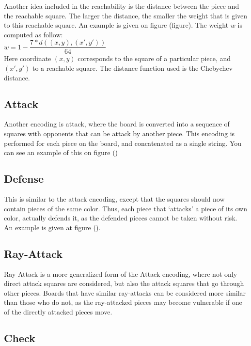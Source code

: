 \documentclass[11pt]{article}
\begin{document}
    Another idea included in the reachability is the distance between the piece and the reachable square. The larger the distance, the smaller the weight that is given to this reachable square. An example is given on figure (figure).
    The weight $w$ is computed as follow:\\

    $w = 1 - \dfrac{7 * d((x,y),(x',y'))}{64}$ \\

    Here coordinate $(x,y)$ corresponds to the square of a particular piece, and $(x',y')$ to a reachable square. The distance function used is the Chebychev distance.\\


    \subsection{Attack}

    Another encoding is attack, where the board is converted into a sequence of squares with opponents that can be attack by another piece. This encoding is performed for each piece on the board, and concatenated as a single string. You can see an example of this on figure ()

    \subsection{Defense}

    This is similar to the attack encoding, except that the squares should now contain pieces of the same color. Thus, each piece that `attacks' a piece of its own color, actually defends it, as the defended pieces cannot be taken without risk. An example is given at figure ().

    \subsection{Ray-Attack}

    Ray-Attack is a more generalized form of the Attack encoding, where not only direct attack squares are considered, but also the attack squares that go through other pieces. Boards that have similar ray-attacks can be considered more similar than those who do not, as the ray-attacked pieces may become vulnerable if one of the directly attacked pieces move.

    \subsection{Check}
\end{document}
